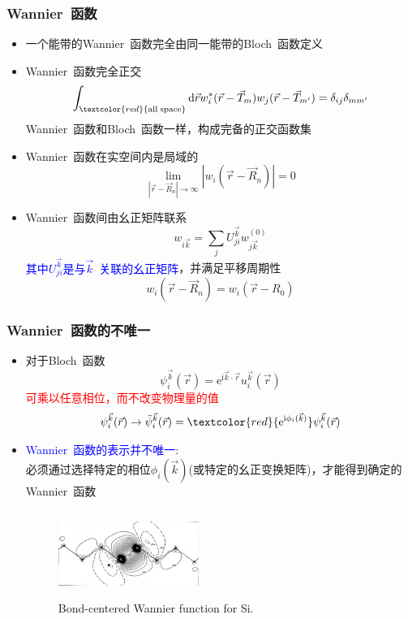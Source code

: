 \frame
{
	\frametitle{\textrm{Wannier~}函数}
	\begin{itemize}
		\item 一个能带的\textrm{Wannier~}函数完全由同一能带的\textrm{Bloch~}函数定义
		\item \textrm{Wannier~}函数完全正交
			\begin{displaymath}
				\int_{\textcolor{red}{\mathrm{all\; space}}}\mathrm{d}\vec rw_i^{\ast}(\vec r-\vec T_m)w_j(\vec r-\vec T_{m^{\prime}})=\delta_{ij}\delta_{mm^{\prime}}
			\end{displaymath}
			\textrm{Wannier~}函数和\textrm{Bloch~}函数一样，构成完备的正交函数集
		\item \textrm{Wannier~}函数在实空间内是局域的
			\begin{displaymath}
				\lim_{|\vec r-\vec R_n|\rightarrow\infty}|w_i(\vec r-\vec R_n)|=0
			\end{displaymath}
		\item \textrm{Wannier~}函数间由幺正矩阵联系
			\begin{displaymath}
				w_{i\vec k}=\sum_jU_{ji}^{\vec k}w_{j\vec k}^{(0)}
			\end{displaymath}
			\textcolor{blue}{其中$U_{ji}^{\vec k}$是与$\vec k$~关联的幺正矩阵}，并满足平移周期性
\begin{displaymath}
	w_i(\vec r-\vec R_n)=w_i(\vec r-R_0)
\end{displaymath}
	\end{itemize}
}

\frame
{
	\frametitle{\textrm{Wannier~}函数的不唯一}
	\begin{itemize}
		\item 对于\textrm{Bloch~}函数
			\begin{displaymath}
				\psi_i^{\vec k}(\vec r)=\mathrm{e}^{\mathrm{i}\vec k\cdot\vec r}u_i^{\vec k}(\vec r)
			\end{displaymath}
			\textcolor{red}{可乘以任意相位，而不改变物理量的值}
			\begin{displaymath}
				\psi_i^{\vec k}(\vec r)\rightarrow\tilde\psi_i^{\vec k}(\vec r)=\textcolor{red}{\mathrm{e}^{\mathrm{i}\phi_i(\vec k)}}\psi_i^{\vec k}(\vec r)
			\end{displaymath}
		\item \textcolor{blue}{\textrm{Wannier~}函数的表示并不唯一}:\\
必须通过选择特定的相位$\phi_i(\vec k)$(或特定的幺正变换矩阵)，才能得到确定的\textrm{Wannier~}函数 
\begin{figure}[h!]
\centering
\vspace*{-0.2in}
\includegraphics[height=1.1in,width=1.8in,viewport=0 0 1100 600,clip]{Figures/Wannier_function-Bondcenter_Si.png}
\caption{\tiny \textrm{Bond-centered Wannier function for Si.}}%
\label{Bond-Centered Wannier function}
\end{figure} 
	\end{itemize}
}

